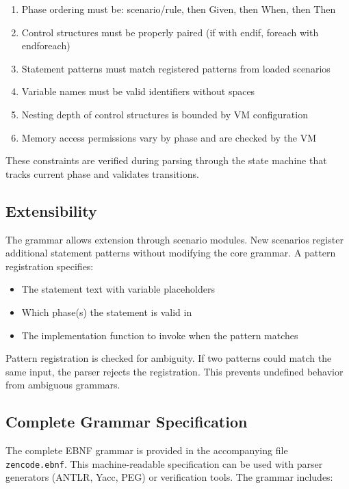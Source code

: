\begin{enumerate}
\item Phase ordering must be: scenario/rule, then Given, then When,
  then Then
\item Control structures must be properly paired (if with endif,
  foreach with endforeach)
\item Statement patterns must match registered patterns from loaded
  scenarios
\item Variable names must be valid identifiers without spaces
\item Nesting depth of control structures is bounded by VM
  configuration
\item Memory access permissions vary by phase and are checked by the
  VM
\end{enumerate}

These constraints are verified during parsing through the state
machine that tracks current phase and validates transitions.

\subsection{Extensibility}

The grammar allows extension through scenario modules. New scenarios
register additional statement patterns without modifying the core
grammar. A pattern registration specifies:

\begin{itemize}
\item The statement text with variable placeholders
\item Which phase(s) the statement is valid in
\item The implementation function to invoke when the pattern matches
\end{itemize}

Pattern registration is checked for ambiguity. If two patterns could
match the same input, the parser rejects the registration. This
prevents undefined behavior from ambiguous grammars.

\subsection{Complete Grammar Specification}

The complete EBNF grammar is provided in the accompanying file
\texttt{zencode.ebnf}. This machine-readable specification can be used
with parser generators (ANTLR, Yacc, PEG) or verification tools. The
grammar includes:

